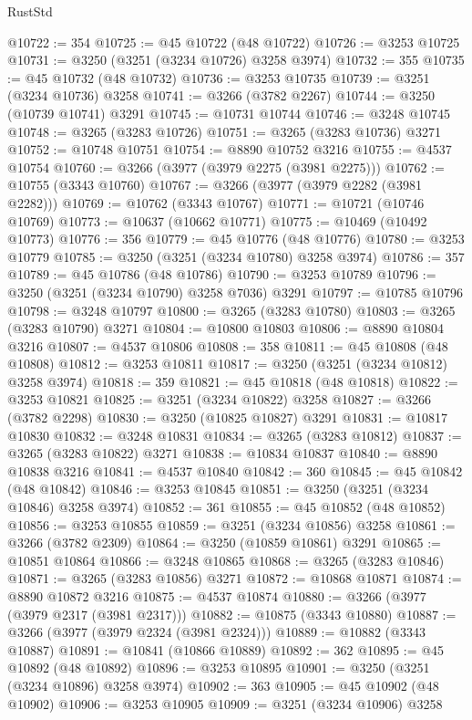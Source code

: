 \begin{lexlean}{RustStd}
\begin{coremodule}
@10722 := 354
@10725 := @45 @10722 (@48 @10722)
@10726 := @3253 @10725
@10731 := @3250 (@3251 (@3234 @10726) @3258 @3974)
@10732 := 355
@10735 := @45 @10732 (@48 @10732)
@10736 := @3253 @10735
@10739 := @3251 (@3234 @10736) @3258
@10741 := @3266 (@3782 @2267)
@10744 := @3250 (@10739 @10741) @3291
@10745 := @10731 @10744
@10746 := @3248 @10745
@10748 := @3265 (@3283 @10726)
@10751 := @3265 (@3283 @10736) @3271
@10752 := @10748 @10751
@10754 := @8890 @10752 @3216
@10755 := @4537 @10754
@10760 := @3266 (@3977 (@3979 @2275 (@3981 @2275)))
@10762 := @10755 (@3343 @10760)
@10767 := @3266 (@3977 (@3979 @2282 (@3981 @2282)))
@10769 := @10762 (@3343 @10767)
@10771 := @10721 (@10746 @10769)
@10773 := @10637 (@10662 @10771)
@10775 := @10469 (@10492 @10773)
@10776 := 356
@10779 := @45 @10776 (@48 @10776)
@10780 := @3253 @10779
@10785 := @3250 (@3251 (@3234 @10780) @3258 @3974)
@10786 := 357
@10789 := @45 @10786 (@48 @10786)
@10790 := @3253 @10789
@10796 := @3250 (@3251 (@3234 @10790) @3258 @7036) @3291
@10797 := @10785 @10796
@10798 := @3248 @10797
@10800 := @3265 (@3283 @10780)
@10803 := @3265 (@3283 @10790) @3271
@10804 := @10800 @10803
@10806 := @8890 @10804 @3216
@10807 := @4537 @10806
@10808 := 358
@10811 := @45 @10808 (@48 @10808)
@10812 := @3253 @10811
@10817 := @3250 (@3251 (@3234 @10812) @3258 @3974)
@10818 := 359
@10821 := @45 @10818 (@48 @10818)
@10822 := @3253 @10821
@10825 := @3251 (@3234 @10822) @3258
@10827 := @3266 (@3782 @2298)
@10830 := @3250 (@10825 @10827) @3291
@10831 := @10817 @10830
@10832 := @3248 @10831
@10834 := @3265 (@3283 @10812)
@10837 := @3265 (@3283 @10822) @3271
@10838 := @10834 @10837
@10840 := @8890 @10838 @3216
@10841 := @4537 @10840
@10842 := 360
@10845 := @45 @10842 (@48 @10842)
@10846 := @3253 @10845
@10851 := @3250 (@3251 (@3234 @10846) @3258 @3974)
@10852 := 361
@10855 := @45 @10852 (@48 @10852)
@10856 := @3253 @10855
@10859 := @3251 (@3234 @10856) @3258
@10861 := @3266 (@3782 @2309)
@10864 := @3250 (@10859 @10861) @3291
@10865 := @10851 @10864
@10866 := @3248 @10865
@10868 := @3265 (@3283 @10846)
@10871 := @3265 (@3283 @10856) @3271
@10872 := @10868 @10871
@10874 := @8890 @10872 @3216
@10875 := @4537 @10874
@10880 := @3266 (@3977 (@3979 @2317 (@3981 @2317)))
@10882 := @10875 (@3343 @10880)
@10887 := @3266 (@3977 (@3979 @2324 (@3981 @2324)))
@10889 := @10882 (@3343 @10887)
@10891 := @10841 (@10866 @10889)
@10892 := 362
@10895 := @45 @10892 (@48 @10892)
@10896 := @3253 @10895
@10901 := @3250 (@3251 (@3234 @10896) @3258 @3974)
@10902 := 363
@10905 := @45 @10902 (@48 @10902)
@10906 := @3253 @10905
@10909 := @3251 (@3234 @10906) @3258

\end{coremodule}
\end{lexlean}
